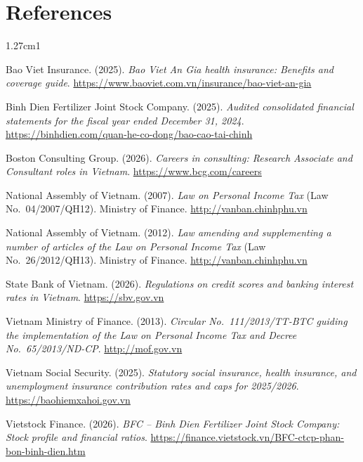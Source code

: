 \chapter*{References}

\sloppy   %
\begin{hangparas}{1.27cm}{1}

Bao Viet Insurance. (2025). \textit{Bao Viet An Gia health insurance: Benefits and coverage guide}. \url{https://www.baoviet.com.vn/insurance/bao-viet-an-gia}

Binh Dien Fertilizer Joint Stock Company. (2025). \textit{Audited consolidated financial statements for the fiscal year ended December 31, 2024}. \url{https://binhdien.com/quan-he-co-dong/bao-cao-tai-chinh}

Boston Consulting Group. (2026). \textit{Careers in consulting: Research Associate and Consultant roles in Vietnam}. \url{https://www.bcg.com/careers}

National Assembly of Vietnam. (2007). \textit{Law on Personal Income Tax} (Law No.~04/2007/QH12). Ministry of Finance. \url{http://vanban.chinhphu.vn}

National Assembly of Vietnam. (2012). \textit{Law amending and supplementing a number of articles of the Law on Personal Income Tax} (Law No.~26/2012/QH13). Ministry of Finance. \url{http://vanban.chinhphu.vn}

State Bank of Vietnam. (2026). \textit{Regulations on credit scores and banking interest rates in Vietnam}. \url{https://sbv.gov.vn}

Vietnam Ministry of Finance. (2013). \textit{Circular No.~111/2013/TT-BTC guiding the implementation of the Law on Personal Income Tax and Decree No.~65/2013/ND-CP}. \url{http://mof.gov.vn}

Vietnam Social Security. (2025). \textit{Statutory social insurance, health insurance, and unemployment insurance contribution rates and caps for 2025/2026}. \url{https://baohiemxahoi.gov.vn}

Vietstock Finance. (2026). \textit{BFC -- Binh Dien Fertilizer Joint Stock Company: Stock profile and financial ratios}. \url{https://finance.vietstock.vn/BFC-ctcp-phan-bon-binh-dien.htm}

\end{hangparas}
\fussy   %
